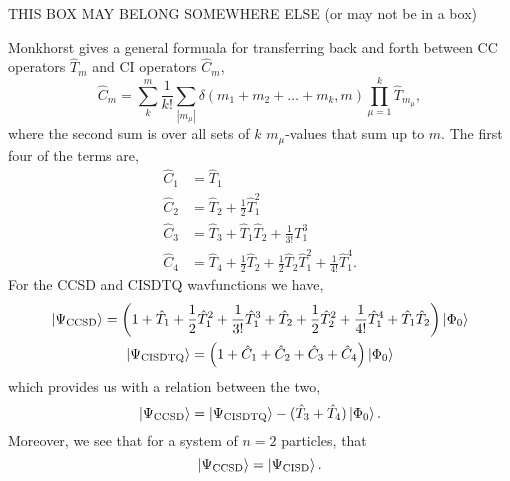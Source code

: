 \begin{tcolorbox}[title={Difference between Coupled Cluster and Configuration Interaction}, 
    colback={white},
    colbacktitle={pink},
    coltitle={black}]

    THIS BOX MAY BELONG SOMEWHERE ELSE (or may not be in a box)

    Monkhorst\cite{monkhorst1977calculation} gives a general formuala for transferring 
    back and forth between CC operators $\hat{T}_m$ and CI operators $\hat{C}_m$,
    \begin{equation}
        \hat{C}_m = \sum_{k}^m\frac{1}{k!}\sum_{|m_\mu|}
            \delta(m_1 + m_2 + \dots + m_k, m) \prod_{\mu=1}^k\hat{T}_{m_\mu},
    \end{equation}
    where the second sum is over all sets of $k$ $m_\mu$-values that sum up to $m$.
    The first four of the terms are,
    \begin{align}
        \hat{C}_1 &= \hat{T}_1 \\
        \hat{C}_2 &= \hat{T}_2 + \frac{1}{2} \hat{T}_1^2 \\
        \hat{C}_3 &= \hat{T}_3 + \hat{T}_1\hat{T}_2 + \frac{1}{3!} T_1^3 \\
        \hat{C}_4 &= \hat{T}_4 + \frac{1}{2}\hat{T}_2
            + \frac{1}{2}\hat{T}_2\hat{T}_1^2 + \frac{1}{4!}\hat{T}_1^4.
    \end{align}
    For the CCSD and CISDTQ wavfunctions we have,
    \begin{gather}
        \ket{\Psi_{\text{CCSD}}} = \left(
            1 + \hat{T}_1 + \frac{1}{2}\hat{T}_1^2 + \frac{1}{3!}\hat{T}_1^3 
            + \hat{T}_2 + \frac{1}{2}\hat{T}_2^2 + \frac{1}{4!}\hat{T}_1^4 
            + \hat{T}_1\hat{T}_2 
        \right) \ket{\Phi_0} \\
        \ket{\Psi_{\text{CISDTQ}}} = \left(
            1 + \hat{C}_1 + \hat{C}_2  + \hat{C}_3 + \hat{C}_4
        \right)\ket{\Phi_0}
    \end{gather}
    which provides us with a relation between the two,
    \begin{equation}
        \ket{\Psi_{\text{CCSD}}} 
            = \ket{\Psi_{\text{CISDTQ}}} - (\hat{T}_3 + \hat{T}_4)\ket{\Phi_0}.
    \end{equation}
    Moreover, we see that for a system of $n=2$ particles, that
    \begin{equation}
        \ket{\Psi_{\text{CCSD}}} = \ket{\Psi_{\text{CISD}}}.
    \end{equation}
\end{tcolorbox}


